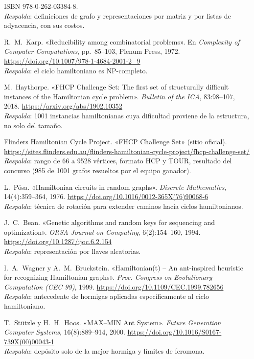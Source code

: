 \documentclass[11pt,letterpaper]{article}
\theoremstyle{definition}
\begin{document}
\begin{enumerate}[label={[\arabic*]},leftmargin=*]
        ISBN 978-0-262-03384-8.\\
        \emph{Respalda}: definiciones de grafo y representaciones por matriz y por listas
        de adyacencia, con sus costos.
  \item R.~M.~Karp. «Reducibility among combinatorial problems». En \emph{Complexity of
        Computer Computations}, pp.~85--103, Plenum Press, 1972.
        \url{https://doi.org/10.1007/978-1-4684-2001-2_9}\\
        \emph{Respalda}: el ciclo hamiltoniano es NP-completo.
  \item M.~Haythorpe. «FHCP Challenge Set: The first set of structurally difficult instances
        of the Hamiltonian cycle problem». \emph{Bulletin of the ICA}, 83:98--107, 2018.
        \url{https://arxiv.org/abs/1902.10352}\\
        \emph{Respalda}: 1001 instancias hamiltonianas cuya dificultad proviene de la
        estructura, no solo del tamaño.
  \item Flinders Hamiltonian Cycle Project. «FHCP Challenge Set» (sitio oficial).
        \url{https://sites.flinders.edu.au/flinders-hamiltonian-cycle-project/fhcp-challenge-set/}\\
        \emph{Respalda}: rango de 66 a 9528 vértices, formato HCP y TOUR, resultado del
        concurso (985 de 1001 grafos resueltos por el equipo ganador).
  \item L.~Pósa. «Hamiltonian circuits in random graphs». \emph{Discrete Mathematics},
        14(4):359--364, 1976. \url{https://doi.org/10.1016/0012-365X(76)90068-6}\\
        \emph{Respalda}: técnica de rotación para extender caminos hacia ciclos hamiltonianos.
  \item J.~C.~Bean. «Genetic algorithms and random keys for sequencing and optimization».
        \emph{ORSA Journal on Computing}, 6(2):154--160, 1994.
        \url{https://doi.org/10.1287/ijoc.6.2.154}\\
        \emph{Respalda}: representación por llaves aleatorias.
  \item I.~A.~Wagner y A.~M.~Bruckstein. «Hamiltonian(t) -- An ant-inspired heuristic for
        recognizing Hamiltonian graphs». \emph{Proc. Congress on Evolutionary Computation
        (CEC 99)}, 1999. \url{https://doi.org/10.1109/CEC.1999.782656}\\
        \emph{Respalda}: antecedente de hormigas aplicadas específicamente al ciclo
        hamiltoniano.
  \item T.~Stützle y H.~H.~Hoos. «MAX--MIN Ant System». \emph{Future Generation Computer
        Systems}, 16(8):889--914, 2000.
        \url{https://doi.org/10.1016/S0167-739X(00)00043-1}\\
        \emph{Respalda}: depósito solo de la mejor hormiga y límites de feromona.
\end{enumerate}
\end{document}

